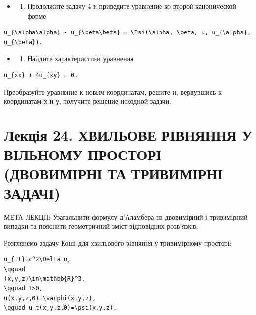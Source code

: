 \documentclass[
  ukrainian,
]{article}
\providecommand{\tightlist}{%
  \setlength{\itemsep}{0pt}\setlength{\parskip}{0pt}}
\begin{document}
\begin{itemize}
\tightlist
\item
  \begin{enumerate}
  \def\labelenumi{\arabic{enumi}.}
  \setcounter{enumi}{4}
  \tightlist
  \item
    Продолжите задачу 4 и приведите уравнение ко второй канонической
    форме
  \end{enumerate}
\end{itemize}

\begin{verbatim}
u_{\alpha\alpha} - u_{\beta\beta} = \Psi(\alpha, \beta, u, u_{\alpha}, u_{\beta}).
\end{verbatim}

\begin{itemize}
\tightlist
\item
  \begin{enumerate}
  \def\labelenumi{\arabic{enumi}.}
  \setcounter{enumi}{5}
  \tightlist
  \item
    Найдите характеристики уравнения
  \end{enumerate}
\end{itemize}

\begin{verbatim}
u_{xx} + 4u_{xy} = 0.
\end{verbatim}

Преобразуйте уравнение к новым координатам, решите и, вернувшись к
координатам \texttt{x} и \texttt{y}, получите решение исходной задачи.

\section{Лекція 24. ХВИЛЬОВЕ РІВНЯННЯ У ВІЛЬНОМУ ПРОСТОРІ (ДВОВИМІРНІ ТА
ТРИВИМІРНІ
ЗАДАЧІ)}\label{ux43bux435ux43aux446ux456ux44f-24.-ux445ux432ux438ux43bux44cux43eux432ux435-ux440ux456ux432ux43dux44fux43dux43dux44f-ux443-ux432ux456ux43bux44cux43dux43eux43cux443-ux43fux440ux43eux441ux442ux43eux440ux456-ux434ux432ux43eux432ux438ux43cux456ux440ux43dux456-ux442ux430-ux442ux440ux438ux432ux438ux43cux456ux440ux43dux456-ux437ux430ux434ux430ux447ux456}

МЕТА ЛЕКЦІЇ: Узагальнити формулу д'Аламбера на двовимірний і тривимірний
випадки та пояснити геометричний зміст відповідних розв'язків.

Розглянемо задачу Коші для хвильового рівняння у тривимірному просторі:

\begin{verbatim}
u_{tt}=c^2\Delta u,
\qquad
(x,y,z)\in\mathbb{R}^3,
\qquad t>0,
u(x,y,z,0)=\varphi(x,y,z),
\qquad u_t(x,y,z,0)=\psi(x,y,z).
\end{verbatim}
\end{document}
